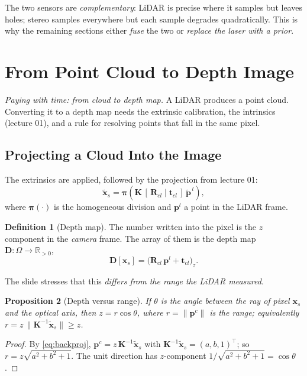 \documentclass[11pt,a4paper]{article}
\newcommand{\R}{\mathbb{R}}
\newcommand{\xt}{\tilde{\mathbf{x}}}
\newcommand{\Kinv}{\bm K^{-1}}
\theoremstyle{definition}
\newtheorem{definition}{Definition}[section]
\theoremstyle{plain}
\newtheorem{proposition}[definition]{Proposition}
\theoremstyle{remark}
\begin{document}
\begin{intuition}
The two sensors are \emph{complementary}: LiDAR is precise where it samples but leaves holes; stereo samples everywhere but each sample degrades quadratically. This is why the remaining sections either \emph{fuse} the two or \emph{replace the laser with a prior}.
\end{intuition}
 
\section{From Point Cloud to Depth Image }
\emph{Paying with time: from cloud to depth map.} A LiDAR produces a point cloud. Converting it to a depth map needs the extrinsic calibration, the intrinsics (lecture 01), and a rule for resolving points that fall in the same pixel.
 
\subsection{Projecting a Cloud Into the Image }
 
The extrinsics are applied, followed by the projection from lecture 01:
\begin{equation}\label{eq:lidarproj}
\xt_s=\bm\pi\!\left(\bm K\,[\,\bm R_{cl}\mid\bm t_{cl}\,]\,\tilde{\bm p}^{\,l}\right),
\end{equation}
where $\bm\pi(\cdot)$ is the homogeneous division and $\bm p^l$ a point in the LiDAR frame.
 
\begin{definition}[Depth map]
The number written into the pixel is the $z$ component in the \emph{camera} frame. The array of them is the depth map $\bm D:\Omega\to\R_{>0}$,
\[
\bm D[\bm x_s]=\big(\bm R_{cl}\,\bm p^{l}+\bm t_{cl}\big)_z .
\]
\end{definition}
 
The slide stresses that this \emph{differs from the range the LiDAR measured}.
 
\begin{proposition}[Depth versus range]\label{prop:rangez}
If $\theta$ is the angle between the ray of pixel $\bm x_s$ and the optical axis, then $z=r\cos\theta$, where $r=\|\bm p^c\|$ is the range; equivalently $r=z\,\|\Kinv\xt_s\|\ge z$.
\end{proposition}
\begin{proof}
By \eqref{eq:backproj}, $\bm p^c=z\,\Kinv\xt_s$ with $\Kinv\xt_s=(a,b,1)^\top$; so $r=z\sqrt{a^2+b^2+1}$. The unit direction has $z$-component $1/\sqrt{a^2+b^2+1}=\cos\theta$. \qedhere
\end{proof}
 
\end{document}
